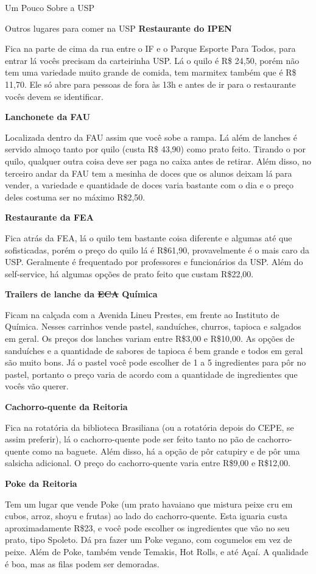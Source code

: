 \begin{secao}{Um Pouco Sobre a USP}
\begin{subsecao}{Outros lugares para comer na USP}
{\bf Restaurante do IPEN}

Fica na parte de cima da rua entre o IF e o Parque Esporte Para Todos, para
entrar lá vocês precisam da carteirinha USP. Lá o quilo é R\$ 24,50, porém não
tem uma variedade muito grande de comida, tem marmitex também que é R\$ 11,70.
Ele só abre para pessoas de fora às 13h e antes de ir para o restaurante vocês
devem se identificar.

{\bf Lanchonete da FAU}

Localizada dentro da FAU assim que você sobe a rampa. Lá além de lanches é
servido almoço tanto por quilo (custa R\$ 43,90) como prato feito. Tirando o por
quilo, qualquer outra coisa deve ser paga no caixa antes de retirar. Além
disso, no terceiro andar da FAU tem a mesinha de doces que os alunos deixam lá
para vender, a variedade e quantidade de doces varia bastante com o dia e o
preço deles costuma ser no máximo R\$2,50.

{\bf Restaurante da FEA}

Fica atrás da FEA, lá o quilo tem bastante coisa diferente e algumas até que
sofisticadas, porém o preço do quilo lá é R\$61,90, provavelmente é o mais caro
da USP. Geralmente é frequentado por professores e funcionários da USP. Além do
self-service, há algumas opções de prato feito que custam R\$22,00.

{\bf Trailers de lanche da \sout{ECA} Química}

Ficam na calçada com a Avenida Lineu Prestes, em frente ao Instituto de
Química. Nesses carrinhos vende pastel, sanduíches, churros, tapioca e salgados
em geral. Os preços dos lanches variam entre R\$3,00 e R\$10,00. As opções de
sanduíches e a quantidade de sabores de tapioca é bem grande e todos em geral
são muito bons. Já o pastel você pode escolher de 1 a 5 ingredientes para pôr
no pastel, portanto o preço varia de acordo com a quantidade de ingredientes que
vocês vão querer.

{\bf Cachorro-quente da Reitoria}

Fica na rotatória da biblioteca Brasiliana (ou a rotatória depois do CEPE, se assim preferir),
lá o cachorro-quente pode ser feito tanto no pão de cachorro-quente como na baguete. Além disso,
há a opção de pôr catupiry e de pôr uma salsicha adicional. O preço do cachorro-quente varia
entre R\$9,00 e R\$12,00.

{\bf Poke da Reitoria}

Tem um lugar que vende Poke (um prato havaiano que mistura peixe cru em cubos,
arroz, shoyu e frutas) ao lado do cachorro-quente. Esta iguaria custa
aproximadamente R\$23, e você pode escolher os ingredientes que vão no seu prato,
tipo Spoleto. Dá pra fazer um Poke vegano, com cogumelos em vez de peixe. Além de
Poke, também vende Temakis, Hot Rolls, e até Açaí. A qualidade é boa, mas as filas
podem ser demoradas.


\end{subsecao}
\end{secao}
